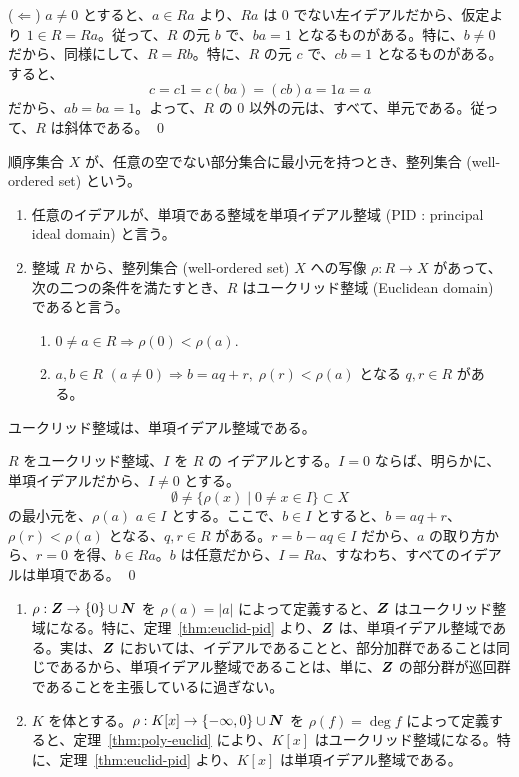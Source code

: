 ($\Leftarrow$) $a\neq 0$ とすると、$a\in Ra$ より、$Ra$ は $0$ でない左イデアルだから、仮定より $1\in R = Ra$。従って、$R$ の元 $b$ で、$ba = 1$ となるものがある。特に、$b\neq 0$ だから、同様にして、$R = Rb$。特に、$R$ の元 $c$ で、$cb = 1$ となるものがある。すると、
$$c = c1 = c(ba) = (cb)a = 1a = a$$
だから、$ab = ba = 1$。よって、$R$ の $0$ 以外の元は、すべて、単元である。従って、$R$ は斜体である。
\qed

\medskip
順序集合 $X$ が、任意の空でない部分集合に最小元を持つとき、整列集合 (well-ordered set) という。

\begin{definition}
\begin{enumerate}
\item 任意のイデアルが、単項である整域を単項イデアル整域 (PID : principal ideal domain) と言う。
\item 整域 $R$ から、整列集合 (well-ordered set) $X$ への写像 $\rho : R \rightarrow X$ があって、次の二つの条件を満たすとき、$R$ はユークリッド整域 (Euclidean domain) であると言う。
	\begin{enumerate}
	\item $0\neq a\in R \Rightarrow \rho(0) < \rho(a)$.
	\item $a, b\in R$ $(a\neq 0)\Rightarrow  b = aq + r,\;\rho(r) < \rho(a)$ となる $q, r\in R$ がある。
	\end{enumerate}
\end{enumerate}
\end{definition}

\begin{thm} \label{thm:euclid-pid}
ユークリッド整域は、単項イデアル整域である。
\end{thm}
\proof
$R$ をユークリッド整域、$I$ を $R$ の イデアルとする。$I = 0$ ならば、明らかに、単項イデアルだから、$I\neq 0$ とする。
$$\emptyset \neq \{\rho(x)\mid 0\neq x\in I\}\subset X$$
の最小元を、$\rho(a)$ $a\in I$ とする。ここで、$b\in I$ とすると、$b = aq + r$、$\rho(r) < \rho(a)$ となる、$q, r\in R$ がある。$r = b - aq \in I$ だから、$a$ の取り方から、$r = 0$ を得、$b\in Ra$。$b$ は任意だから、$I = Ra$、すなわち、すべてのイデアルは単項である。
\qed

\begin{eg}
\begin{enumerate}
\item $\rho : \mbox{\boldmath $Z$} \rightarrow \{0\}\cup \mbox{\boldmath $N$}$ を $\rho(a) = |a|$ によって定義すると、$\mbox{\boldmath $Z$}$ はユークリッド整域になる。特に、定理~\ref{thm:euclid-pid} より、$\mbox{\boldmath $Z$}$ は、単項イデアル整域である。実は、$\mbox{\boldmath $Z$}$ においては、イデアルであることと、部分加群であることは同じであるから、単項イデアル整域であることは、単に、$\mbox{\boldmath $Z$}$ の部分群が巡回群であることを主張しているに過ぎない。
\item $K$ を体とする。$\rho : K[x] \rightarrow \{-\infty, 0\}\cup \mbox{\boldmath $N$}$ を $\rho(f) = \deg f$ によって定義すると、定理~\ref{thm:poly-euclid} により、$K[x]$ はユークリッド整域になる。特に、定理~\ref{thm:euclid-pid} より、$K[x]$ は単項イデアル整域である。
\end{enumerate}
\end{eg}

